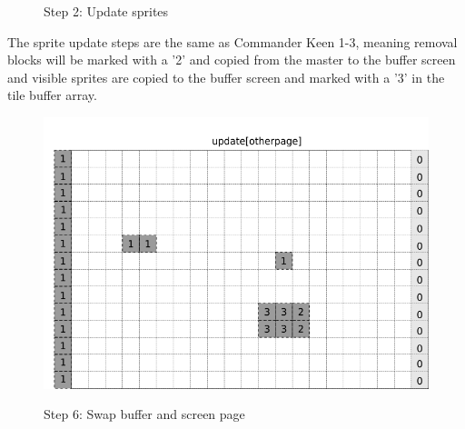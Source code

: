 \documentclass[book.tex]{subfiles}
\begin{document}
\begin{figure}[H]
\centering
 \caption{Step 2: Update sprites}
 \label{fig:kc4_6_add_column}
\end{figure}


\begin{minipage}{.4\textwidth}
The sprite update steps are the same as Commander Keen 1-3, meaning removal blocks will be marked with a '2' and copied from the master to the buffer screen and visible sprites are copied to the buffer screen and marked with a '3' in the tile buffer array.
 \end{minipage}
\begin{minipage}{.6\textwidth}
\begin{figure}[H]
  \centering
 \includegraphics[width=.9\textwidth]{screenshots_300dpi/game/Scroll_KC4_6_1-scroll_update_sprite.png}
 \label{fig:kc4_6_update_array}  
\end{figure}
\end{minipage}

\pagebreak

\begin{figure}[H]
\centering
 \caption{Step 6: Swap buffer and screen page}
 \label{fig:k4_6_update_final}
\end{figure}
\end{document}
